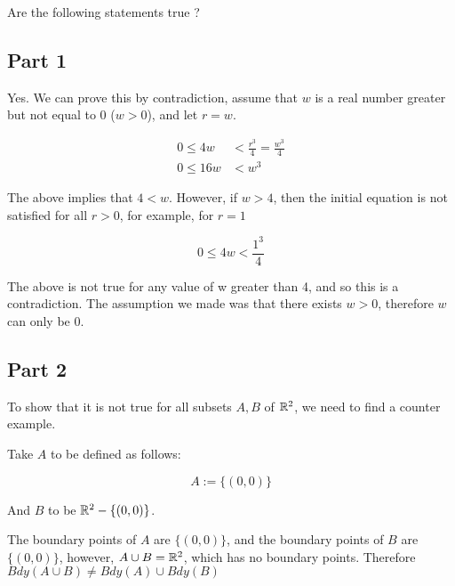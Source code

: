 \documentclass[12pt]{article} %
\begin{document}
\begin{homeworkProblem}

    Are the following statements true ?

    \subsection*{Part 1}

    Yes. We can prove this by contradiction, assume that $w$ is a real number greater but not equal to 0 ($w > 0$),
    and let $r = w$.

    \begin{align*}
        0 \leq 4w  & < \frac{r^3}{4} = \frac{w^3}{4} \\
        0 \leq 16w & < w^3
    \end{align*}

    The above implies that $4 < w$. However, if $w > 4$, then the initial equation is not satisfied for all $r > 0$,
    for example, for $r = 1$

    $$
        0 \leq 4w < \frac{1^3}{4}
    $$

    The above is not true for any value of w greater than 4, and so this is a contradiction. The assumption we made was that
    there exists $w > 0$, therefore $w$ can only be 0.

    \subsection*{Part 2}

    To show that it is not true for all subsets $A, B$ of $\mathbb{R}^2$, we need to find a counter example.

    Take $A$ to be defined as follows:

    $$
        A := \{(0, 0)\}
    $$

    And $B$ to be $\mathbb{R}^2 - \{(0, 0)\}$.

    The boundary points of $A$ are $\{(0, 0)\}$, and the boundary points of $B$ are $\{(0, 0)\}$,
    however, $A \cup B = \mathbb{R}^2$, which has no boundary points. Therefore $Bdy(A \cup B) \not= Bdy(A) \cup Bdy(B)$




\end{homeworkProblem}
\end{document}
